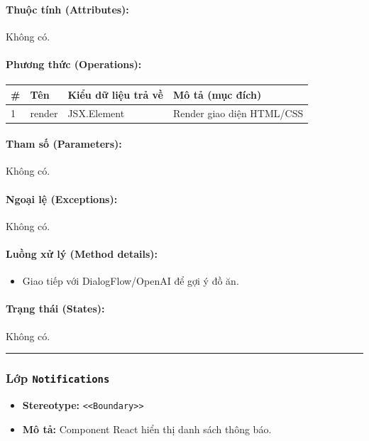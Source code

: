 \documentclass[12pt,a4paper]{article}
\begin{document}
\paragraph{Thuộc tính (Attributes):}
Không có.

\paragraph{Phương thức (Operations):}
\begin{longtable}{|p{0.6cm}|p{3.8cm}|p{2.6cm}|p{6.5cm}|}
\hline
\textbf{\#} & \textbf{Tên} & \textbf{Kiểu dữ liệu trả về} & \textbf{Mô tả (mục đích)} \\ \hline
\endhead
1 & render & JSX.Element & Render giao diện HTML/CSS \\ \hline
\end{longtable}

\paragraph{Tham số (Parameters):}
Không có.

\paragraph{Ngoại lệ (Exceptions):}
Không có.

\paragraph{Luồng xử lý (Method details):}
\begin{itemize}[leftmargin=*]
    \item Giao tiếp với DialogFlow/OpenAI để gợi ý đồ ăn.
\end{itemize}


\paragraph{Trạng thái (States):}
Không có.

\vskip 0.5cm
\noindent\rule{\textwidth}{0.5pt}
\vskip 0.5cm

\subsubsection{Lớp \texttt{Notifications}}
\begin{itemize}[leftmargin=*]
    \item \textbf{Stereotype:} \texttt{\textless{}\textless{}Boundary\textgreater{}\textgreater{}}
    \item \textbf{Mô tả:} Component React hiển thị danh sách thông báo.
\end{itemize}
\end{document}
